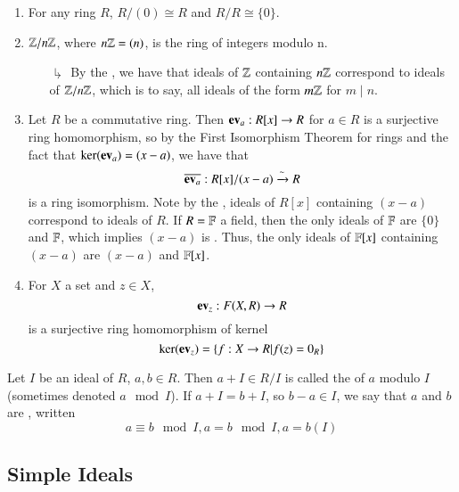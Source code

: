 \documentclass[12pt, a4paper, twoside, openright, titlepage]{book}
\begin{document}
\begin{eg}{}{}
    \leavevmode
    \begin{enumerate}
        \item For any ring $R$, $R/(0) \cong R$ and $R/R \cong \{0\}$.
        \item $\mathbb Z/n\mathbb Z$, where $n\mathbb Z = (n)$, is the ring of integers modulo n.
        \begin{enumerate}
            \item[$\drsh$] By the , we have that ideals of $\mathbb Z$ containing $n\mathbb Z$ correspond to ideals of $\mathbb Z/n\mathbb Z$, which is to say, all ideals of the form $m\mathbb Z$ for $m \;\vert\;n$.
        \end{enumerate}
        \item Let $R$ be a commutative ring. Then $\operatorname{\bf{ev}}_a:R[x]\rightarrow R$ for $a \in R$ is a surjective ring homomorphism, so by the First Isomorphism Theorem for rings and the fact that $\ker(\operatorname{\bf{ev}}_a) = (x-a)$, we have that \begin{equation}
            \overline{\operatorname{\bf{ev}}_a}: R[x]/(x-a) \xrightarrow{\sim} R
        \end{equation}
        is a ring isomorphism. Note by the , ideals of $R[x]$ containing $(x-a)$ correspond to ideals of $R$. If $R = \mathbb F$ a field, then the only ideals of $\mathbb F$ are $\{0\}$ and $\mathbb F$, which implies $(x-a)$ is . Thus, the only ideals of $\mathbb F[x]$ containing $(x-a)$ are $(x-a)$ and $\mathbb F[x]$.
        \item For $X$ a set and $z \in X$, $$\operatorname{\bf{ev}}_z:F(X,R) \rightarrow R$$
        is a surjective ring homomorphism of kernel $$\ker(\operatorname{\bf{ev}}_z) = \{f:X\rightarrow R\vert f(z) = 0_R\}$$
    \end{enumerate}
\end{eg}

\begin{defn}{}{}
    Let $I$ be an ideal of $R$, $a,b \in R$. Then $a + I \in R/I$ is called the  of $a$ modulo $I$ (sometimes denoted $a \mod I$). If $a + I = b + I$, so $b - a \in I$, we say that $a$ and $b$ are , written \begin{equation}
        a \equiv b \mod I, a = b \mod I, a = b (I)
    \end{equation}
\end{defn}

\subsection{\textsection Simple Ideals}
\end{document}
